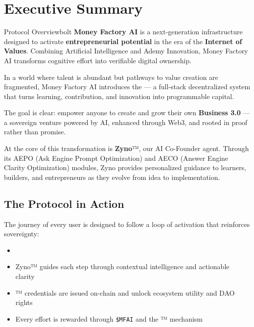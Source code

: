 \documentclass[12pt]{article}
\begin{document}
\section{Executive Summary}

\begin{mfai-box}{Protocol Overview}{bolt}
\textbf{Money Factory AI} is a next-generation infrastructure designed to activate \textbf{entrepreneurial potential} in the era of the \textbf{Internet of Values}. Combining Artificial Intelligence and Ademy Innovation, Money Factory AI transforms cognitive effort into verifiable digital ownership.
\end{mfai-box}

In a world where talent is abundant but pathways to value creation are fragmented, Money Factory AI introduces the  — a full-stack decentralized system that turns learning, contribution, and innovation into programmable capital.

The goal is clear: empower anyone to create and grow their own \textbf{Business 3.0} — a sovereign venture powered by AI, enhanced through Web3, and rooted in proof rather than promise.

At the core of this transformation is \textbf{Zyno}™, our AI Co-Founder agent. Through its AEPO (Ask Engine Prompt Optimization) and AECO (Answer Engine Clarity Optimization) modules, Zyno provides personalized guidance to learners, builders, and entrepreneurs as they evolve from idea to implementation.


\subsection*{The Protocol in Action}

The journey of every user is designed to follow a loop of activation that reinforces sovereignty:

\begin{itemize}
    \item {} \textrightarrow\  \textrightarrow\  \textrightarrow\  \textrightarrow\  \textrightarrow\ 
    \item Zyno™ guides each step through contextual intelligence and actionable clarity
    \item {}™ credentials are issued on-chain and unlock ecosystem utility and DAO rights
    \item Every effort is rewarded through \texttt{\$MFAI} and the ™ mechanism
\end{itemize}
\end{document}

